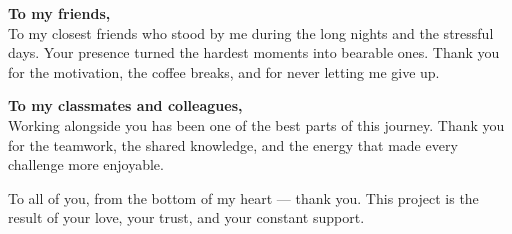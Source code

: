 \vspace{0.6cm}

\noindent\textbf{To my friends,}\\
To my closest friends who stood by me during the long nights and the stressful days. Your presence turned the hardest moments into bearable ones. Thank you for the motivation, the coffee breaks, and for never letting me give up.

\vspace{0.6cm}

\noindent\textbf{To my classmates and colleagues,}\\
Working alongside you has been one of the best parts of this journey. Thank you for the teamwork, the shared knowledge, and the energy that made every challenge more enjoyable.

\vspace{0.8cm}

\noindent To all of you, from the bottom of my heart --- thank you. This project is the result of your love, your trust, and your constant support.
